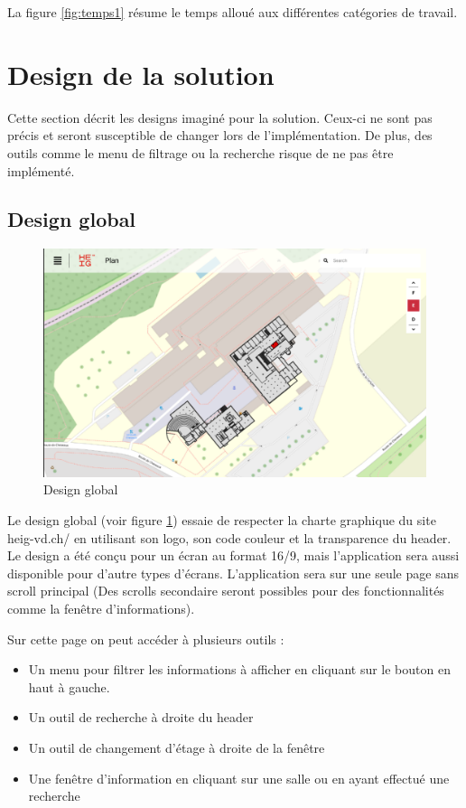 \documentclass[
    iai, %
    il, %
]{heig-tb}
\begin{document}
La figure \ref{fig:temps1} résume le temps alloué aux différentes catégories de travail.


\section{Design de la solution}

Cette section décrit les designs imaginé pour la solution.
Ceux-ci ne sont pas précis et seront susceptible de changer lors de l'implémentation.
De plus, des outils comme le menu de filtrage ou la recherche risque de ne pas être implémenté.

\subsection{Design global}

\begin{figure}[h]
    \centering
    \includegraphics[scale=0.4]{designGlobal.png}
    \caption{Design global}
    \label{fig:globalDesign}
\end{figure}

Le design global (voir figure \ref{fig:globalDesign}) essaie de respecter la charte graphique du site heig-vd.ch/ en utilisant son logo, son code couleur et la transparence du header.
Le design a été conçu pour un écran au format 16/9, mais l'application sera aussi disponible pour d'autre types d'écrans.
L'application sera sur une seule page sans scroll principal
(Des scrolls secondaire seront possibles pour des fonctionnalités comme la fenêtre d'informations).

Sur cette page on peut accéder à plusieurs outils :

\begin{itemize}
    \item Un menu pour filtrer les informations à afficher en cliquant sur le bouton en haut à gauche.
    \item Un outil de recherche à droite du header
    \item Un outil de changement d'étage à droite de la fenêtre
    \item Une fenêtre d'information en cliquant sur une salle ou en ayant effectué une recherche
\end{itemize}
\end{document}
